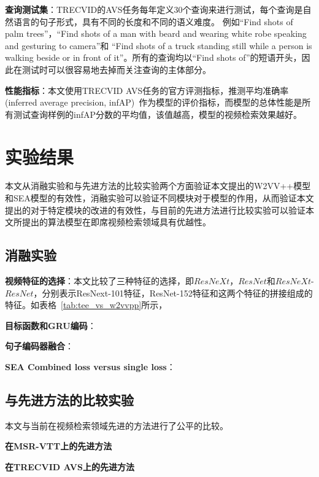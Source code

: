 \textbf{查询测试集}：TRECVID的AVS任务每年定义30个查询来进行测试，每个查询是自然语言的句子形式，具有不同的长度和不同的语义难度。
例如“Find shots of palm trees”，“Find shots of a man with beard and wearing white robe speaking and gesturing to camera”和
“Find shots of a truck standing still while a person is walking beside or in front of it”。所有的查询均以“Find shots of”的短语开头，因此在测试时可以很容易地去掉而关注查询的主体部分。

\textbf{性能指标}：本文使用TRECVID AVS任务的官方评测指标，推测平均准确率(inferred average precision, infAP)~\cite{awad2016trecvid,awad2017trecvid,awad2018trecvid,awad2019trecvid}作为模型的评价指标，而模型的总体性能是所有测试查询样例的infAP分数的平均值，该值越高，模型的视频检索效果越好。


\section{实验结果}
本文从消融实验和与先进方法的比较实验两个方面验证本文提出的W2VV++模型和SEA模型的有效性，消融实验可以验证不同模块对于模型的作用，从而验证本文提出的对于特定模块的改进的有效性，与目前的先进方法进行比较实验可以验证本文所提出的算法模型在即席视频检索领域具有优越性。

\subsection{消融实验}
\textbf{视频特征的选择}：本文比较了三种特征的选择，即$ResNeXt$，$ResNet$和$ResNeXt$-$ResNet$，分别表示ResNext-101特征，ResNet-152特征和这两个特征的拼接组成的特征。如表格~\ref{tab:tee_vs_w2vvpp}所示，




\textbf{目标函数和GRU编码}：




\textbf{句子编码器融合}：



\textbf{SEA Combined loss versus single loss}：


\subsection{与先进方法的比较实验}

本文与当前在视频检索领域先进的方法进行了公平的比较。

\textbf{在MSR-VTT上的先进方法} 



\textbf{在TRECVID AVS上的先进方法}



